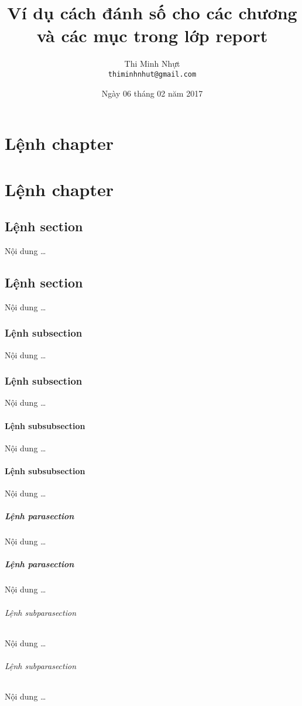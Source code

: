 \documentclass[12pt,a4paper]{report}
\title{\bfseries \huge Ví dụ cách đánh số cho các chương và các mục trong lớp report}
\author{\Large Thi Minh Nhựt \bigskip \\  \Large \texttt{thiminhnhut@gmail.com}}
\date{\Large Ngày 06 tháng 02 năm 2017}
\newcommand{\parasection}[1]{\paragraph{#1}\mbox{}\medskip\par}
\newcommand{\subparasection}[1]{{\setlength{\parindent}{0pt}\subparagraph{#1}\mbox{}\medskip \par}}
\begin{document}
\maketitle
\tableofcontents
\thispagestyle{empty}
\newpage

\chapter{Lệnh chapter}
\chapter{Lệnh chapter}

\section{Lệnh section}
Nội dung \ldots
\section{Lệnh section}
Nội dung \ldots

\subsection{Lệnh subsection}
Nội dung \ldots
\subsection{Lệnh subsection}
Nội dung \ldots

\subsubsection{Lệnh subsubsection}
Nội dung \ldots
\subsubsection{Lệnh subsubsection}
Nội dung \ldots

\parasection{Lệnh parasection}
Nội dung \ldots
\parasection{Lệnh parasection}
Nội dung \ldots

\subparasection{Lệnh subparasection}
Nội dung \ldots
\subparasection{Lệnh subparasection}
Nội dung \ldots
\end{document}

